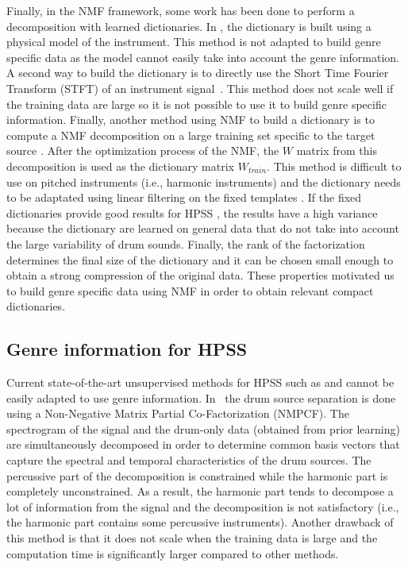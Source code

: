\documentclass{article}
\begin{document}
Finally, in the NMF framework, some work has been done to perform a decomposition with learned dictionaries. In \cite{hennequin2011score}, the dictionary is built using a physical model of the instrument. This method is not adapted to build genre specific data as the model cannot easily take into account the genre information. 
A second way to build the dictionary is to directly use the Short Time Fourier Transform (STFT) of an instrument signal~\cite{wudrum}. This method does not scale well if the training data are large so it is not possible to use it to build genre specific information. 
Finally, another method using NMF to build a dictionary is to compute a NMF decomposition on a large training set specific to the target source \cite{schmidt2006single}. After the optimization process of the NMF, the $W$ matrix from this decomposition is used as the dictionary matrix $W_{train}$. This method is difficult to use on pitched instruments (i.e., harmonic instruments) and the dictionary needs to be adaptated using linear filtering on the fixed templates \cite{jaureguiberry2011adaptation}. If the fixed dictionaries provide good results for HPSS \cite{larocheJournalhidden}, the results have a high variance because the dictionary are learned on general data that do not take into account the large variability of drum sounds. Finally, the rank of the factorization determines the final size of the dictionary and it can be chosen small enough to obtain a strong compression of the original data. These properties motivated us to build genre specific data using NMF in order to obtain relevant compact dictionaries. 



\subsection{Genre information for HPSS}

Current state-of-the-art unsupervised methods for HPSS such as \cite{ono2008separation} and \cite{canadas2014percussive} cannot be easily adapted to use genre information. In~\cite{kim2011nonnegative} the drum source separation is done using a Non-Negative Matrix Partial Co-Factorization (NMPCF). The spectrogram of the signal and the drum-only data (obtained from prior learning) are simultaneously decomposed in order to determine common basis vectors that capture the spectral and temporal characteristics of the drum sources. The percussive part of the decomposition is constrained while the harmonic part is completely unconstrained. As a result, the harmonic part 
tends to decompose a lot of information from the signal and the decomposition is not satisfactory (i.e., the harmonic part contains some percussive instruments). Another drawback of this method is that it does not scale when the training data is large and the computation time is significantly larger compared to other methods.
\end{document}
